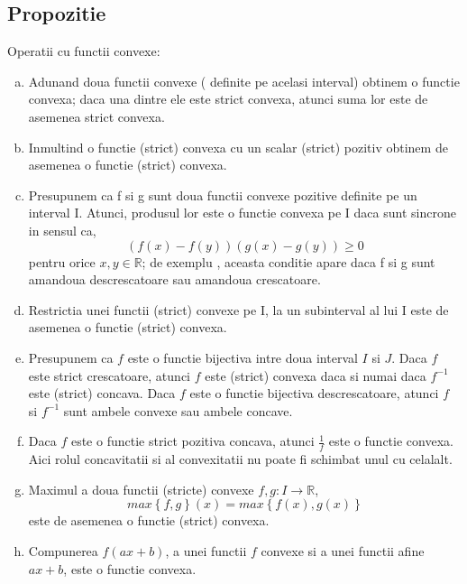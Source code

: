 \documentclass[a4paper,12pt,oneside]{report}
\begin{document}
\subsection{Propozitie}
Operatii cu functii convexe: 
\begin{enumerate}[a)]
\item Adunand doua functii convexe ( definite pe acelasi interval) obtinem o functie convexa; daca una dintre ele este strict convexa, atunci suma lor este de asemenea strict convexa.
\item Inmultind o functie (strict) convexa cu un scalar (strict)  pozitiv obtinem de asemenea o functie (strict) convexa.
\item Presupunem ca f si g sunt doua functii convexe pozitive definite pe un interval I. Atunci, produsul lor este o functie convexa pe I daca sunt sincrone in sensul ca, \begin{displaymath}
   \left ( f\left ( x \right ) - f\left ( y \right ) \right )\left ( g\left ( x \right ) - g\left ( y \right )\right )\geq 0
\end{displaymath} pentru orice \(x , y \in \mathbb{R}\); de exemplu , aceasta conditie apare daca f si g sunt amandoua descrescatoare sau amandoua crescatoare.
\item Restrictia unei functii (strict) convexe pe I, la un subinterval al lui I este de asemenea o functie (strict) convexa. 
\item Presupunem ca \(f\) este o functie bijectiva intre doua interval \(I\) si \(J\). Daca \(f\) este strict crescatoare, atunci \(f\) este (strict) convexa daca si numai daca \(f^{-1}\) este (strict) concava. Daca \(f\) este o functie bijectiva descrescatoare, atunci \(f\) si  \(f^{-1}\) sunt ambele convexe sau ambele concave.
\item Daca \(f\) este o functie strict pozitiva concava, atunci \(\frac{1}{f}\) este o functie convexa. Aici rolul concavitatii si al convexitatii nu poate fi schimbat unul cu celalalt.
\item Maximul a doua functii (stricte) convexe \(f , g : I \rightarrow \mathbb{R}\),
\begin{displaymath}
  max \left \{ f , g \right \}\left ( x \right )=  max \left \{ f\left ( x \right ), g\left ( x \right ) \right \}
\end{displaymath} este de asemenea o functie (strict) convexa.
\item Compunerea \(f\left ( ax + b \right )\), a unei functii \(f\) convexe si a unei functii afine \(ax+b\), este o functie convexa. 
\end{enumerate}
\end{document}
